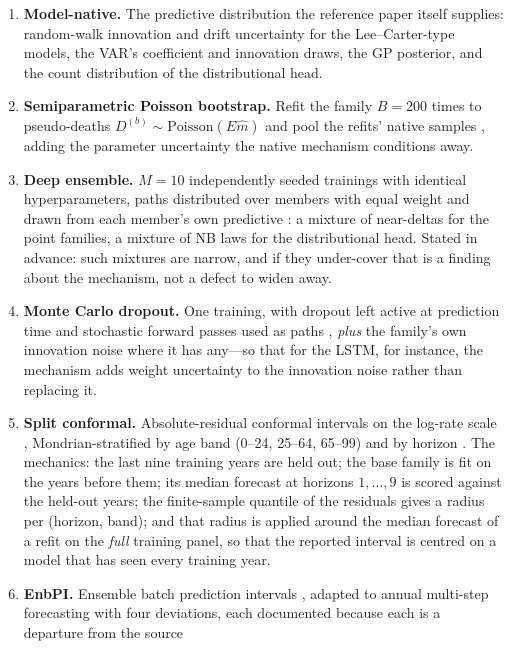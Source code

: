 \begin{enumerate}
\item \textbf{Model-native.} The predictive distribution the reference paper
  itself supplies: random-walk innovation and drift uncertainty for the
  Lee--Carter-type models, the VAR's coefficient and innovation draws, the GP
  posterior, and the count distribution of the distributional head.
\item \textbf{Semiparametric Poisson bootstrap.} Refit the family $B=200$
  times to pseudo-deaths $D^{(b)}\sim\mathrm{Poisson}(E\hat m)$ and pool the
  refits' native samples \citep{brouhns2005bootstrapping}, adding the
  parameter uncertainty the native mechanism conditions away.
\item \textbf{Deep ensemble.} $M=10$ independently seeded trainings with
  identical hyperparameters, paths distributed over members with equal weight
  and drawn from each member's own predictive
  \citep{lakshminarayanan2017simple}: a mixture of near-deltas for the point
  families, a mixture of NB laws for the distributional head. Stated in
  advance: such mixtures are narrow, and if they under-cover that is a finding
  about the mechanism, not a defect to widen away.
\item \textbf{Monte Carlo dropout.} One training, with dropout left active at
  prediction time and stochastic forward passes used as paths
  \citep{gal2016dropout}, \emph{plus} the family's own innovation noise where
  it has any---so that for the LSTM, for instance, the mechanism adds
  weight uncertainty to the innovation noise rather than replacing it.
\item \textbf{Split conformal.} Absolute-residual conformal intervals on the
  log-rate scale \citep{lei2018distribution}, Mondrian-stratified by age band
  (0--24, 25--64, 65--99) and by horizon \citep{vovk2005algorithmic}. The
  mechanics: the last nine training years are held out; the base family is fit
  on the years before them; its median forecast at horizons $1,\dots,9$ is
  scored against the held-out years; the finite-sample quantile of the
  residuals gives a radius per (horizon, band); and that radius is applied
  around the median forecast of a refit on the \emph{full} training panel, so
  that the reported interval is centred on a model that has seen every
  training year.
\item \textbf{EnbPI.} Ensemble batch prediction intervals
  \citep{xu2021conformal}, adapted to annual multi-step forecasting with four
  deviations, each documented because each is a departure from the source

\end{enumerate}
